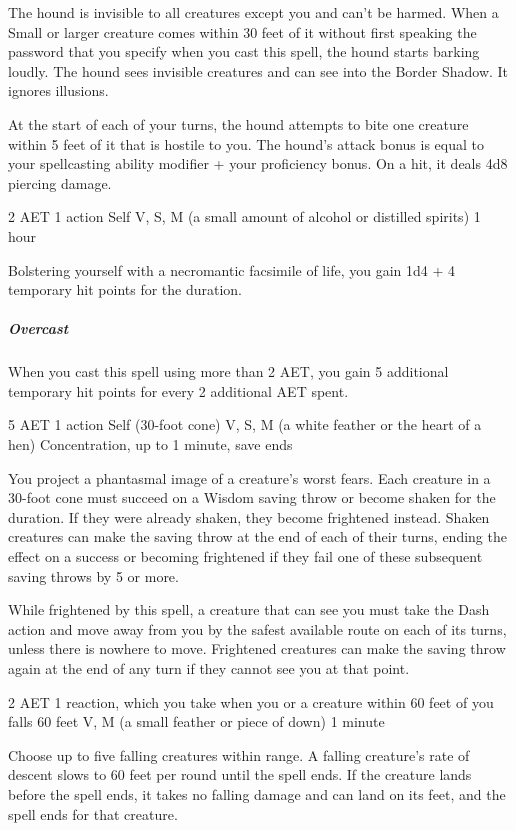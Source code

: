 The hound is invisible to all creatures except you and can't be harmed. When a Small or larger creature comes within 30 feet of it without first speaking the password that you specify when you cast this spell, the hound starts barking loudly. The hound sees invisible creatures and can see into the Border Shadow. It ignores illusions.

At the start of each of your turns, the hound attempts to bite one creature within 5 feet of it that is hostile to you. The hound's attack bonus is equal to your spellcasting ability modifier + your proficiency bonus. On a hit, it deals 4d8 piercing damage.


{2 AET}
{1 action}
{Self}
{V, S, M (a small amount of alcohol or distilled spirits)}
{1 hour}

Bolstering yourself with a necromantic facsimile of life, you gain 1d4 + 4 temporary hit points for the duration.

\subparagraph*{Overcast} When you cast this spell using more than 2 AET, you gain 5 additional temporary hit points for every 2 additional AET spent.


{5 AET}
{1 action}
{Self (30-foot cone)}
{V, S, M (a white feather or the heart of a hen)}
{Concentration, up to 1 minute, save ends}

You project a phantasmal image of a creature's worst fears. Each creature in a 30-foot cone must succeed on a Wisdom saving throw or become shaken for the duration. If they were already shaken, they become frightened instead. Shaken creatures can make the saving throw at the end of each of their turns, ending the effect on a success or becoming frightened if they fail one of these subsequent saving throws by 5 or more.

While frightened by this spell, a creature that can see you must take the Dash action and move away from you by the safest available route on each of its turns, unless there is nowhere to move. Frightened creatures can make the saving throw again at the end of any turn if they cannot see you at that point.


{2 AET}
{1 reaction, which you take when you or a creature within 60 feet of you falls}
{60 feet}
{V, M (a small feather or piece of down)}
{1 minute}

Choose up to five falling creatures within range. A falling creature's rate of descent slows to 60 feet per round until the spell ends. If the creature lands before the spell ends, it takes no falling damage and can land on its feet, and the spell ends for that creature.


